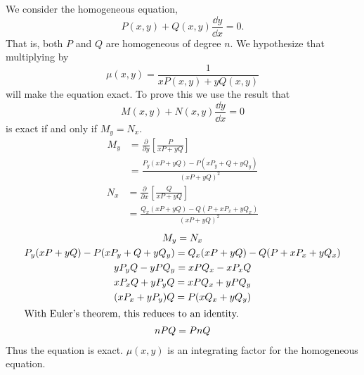 \begin{Solution}
  \label{solution integrating factor homogeneous}
  We consider the homogeneous equation,
  \[
  P(x,y) + Q(x,y) \frac{\dd y}{\dd x} = 0.
  \]
  That is, both $P$ and $Q$ are homogeneous of degree $n$.  We hypothesize 
  that multiplying by
  \[
  \mu(x,y) = \frac{1}{x P(x,y) + y Q(x,y)}
  \]
  will make the equation exact.  To prove this we use the result that 
  \[
  M(x,y) + N(x,y) \frac{\dd y}{\dd x} = 0
  \]
  is exact if and only if $M_y = N_x$.
  \begin{align*}
    M_y &= \frac{\partial}{\partial y} \left[ \frac{ P }{ x P + y Q } \right] 
    \\
    &= \frac{ P_y (x P + y Q) - P (x P_y + Q + y Q_y) }{ (x P + y Q)^2 } 
  \end{align*}
  \begin{align*}
    N_x &= \frac{\partial}{\partial x} \left[ \frac{ Q }{ x P + y Q } \right] 
    \\
    &= \frac{ Q_x (x P + y Q) - Q (P + x P_x + y Q_x) }{ (x P + y Q)^2 }
  \end{align*}
  \begin{gather*}
    M_y = N_x
    \\
    P_y (x P + y Q) - P (x P_y + Q + y Q_y)
    = Q_x (x P + y Q) - Q (P + x P_x + y Q_x) 
    \\
    y P_y Q - y P Q_y = x P Q_x - x P_x Q  
    \\
    x P_x Q + y P_y Q = x P Q_x + y P Q_y 
    \\
    (x P_x + y P_y) Q = P (x Q_x + y Q_y)
    \\
    \intertext{With Euler's theorem, this reduces to an identity.}
    n P Q = P n Q
  \end{gather*}
  Thus the equation is exact.  $\mu(x,y)$ is an integrating factor for 
  the homogeneous equation.
\end{Solution}








